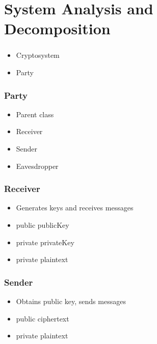 \section{System Analysis and Decomposition}


\begin{frame}
\frametitle{\cry{}}
\begin{itemize}
  \item Cryptosystem
  \item Party
\end{itemize}
\end{frame}


\begin{frame}
\frametitle{Party}
\begin{itemize}
  \item Parent class
  \item Receiver
  \item Sender
  \item Eavesdropper
\end{itemize}
\end{frame}


\begin{frame}
\frametitle{Receiver}
\begin{itemize}
  \item Generates keys and receives messages
  \item public publicKey
  \item private privateKey
  \item private plaintext
\end{itemize}
\end{frame}


\begin{frame}
\frametitle{Sender}
\begin{itemize}
  \item Obtains public key, sends messages
  \item public ciphertext
  \item private plaintext
\end{itemize}
\end{frame}


